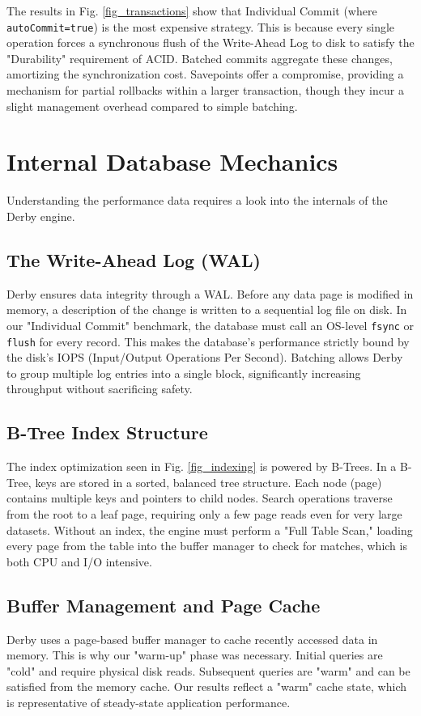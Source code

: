 \documentclass[journal]{IEEEtran}
\begin{document}
The results in Fig. \ref{fig_transactions} show that Individual Commit (where \texttt{autoCommit=true}) is the most expensive strategy. This is because every single operation forces a synchronous flush of the Write-Ahead Log to disk to satisfy the "Durability" requirement of ACID. Batched commits aggregate these changes, amortizing the synchronization cost. Savepoints offer a compromise, providing a mechanism for partial rollbacks within a larger transaction, though they incur a slight management overhead compared to simple batching.

\section{Internal Database Mechanics}

Understanding the performance data requires a look into the internals of the Derby engine.

\subsection{The Write-Ahead Log (WAL)}
Derby ensures data integrity through a WAL. Before any data page is modified in memory, a description of the change is written to a sequential log file on disk. In our "Individual Commit" benchmark, the database must call an OS-level \texttt{fsync} or \texttt{flush} for every record. This makes the database's performance strictly bound by the disk's IOPS (Input/Output Operations Per Second). Batching allows Derby to group multiple log entries into a single block, significantly increasing throughput without sacrificing safety.

\subsection{B-Tree Index Structure}
The index optimization seen in Fig. \ref{fig_indexing} is powered by B-Trees. In a B-Tree, keys are stored in a sorted, balanced tree structure. Each node (page) contains multiple keys and pointers to child nodes. Search operations traverse from the root to a leaf page, requiring only a few page reads even for very large datasets. Without an index, the engine must perform a "Full Table Scan," loading every page from the table into the buffer manager to check for matches, which is both CPU and I/O intensive.

\subsection{Buffer Management and Page Cache}
Derby uses a page-based buffer manager to cache recently accessed data in memory. This is why our "warm-up" phase was necessary. Initial queries are "cold" and require physical disk reads. Subsequent queries are "warm" and can be satisfied from the memory cache. Our results reflect a "warm" cache state, which is representative of steady-state application performance.
\end{document}
